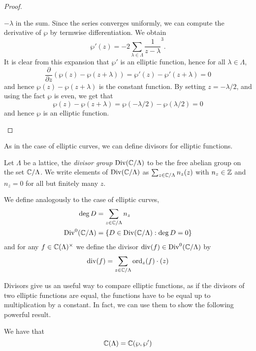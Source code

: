 \begin{proof}
\begin{enumerate}[label=(\alph*)]
		$-\lambda$ in the sum. Since the series converges uniformly,
		we can compute the derivative of $\wp$ by termwise differentiation.
		We obtain
		\begin{equation*}
			\wp'(z) = -2\sum_{\lambda \in \Lambda} \frac{1}{z - \lambda}^3.
		\end{equation*}
		It is clear from this expansion that $\wp'$ is an elliptic function,
		hence for all $\lambda \in \Lambda$,
		\begin{equation*}
			\frac{\partial}{\partial z}(\wp(z) - \wp(z + \lambda))
			= \wp'(z) - \wp'(z + \lambda) = 0
		\end{equation*}
		and hence $\wp(z) - \wp(z + \lambda)$ is the constant function.
		By setting $z = -\lambda/2$, and using the fact $\wp$ is even,
		we get that
		\begin{equation*}
			\wp(z) - \wp(z + \lambda) = \wp(-\lambda/2) - \wp(\lambda/2) = 0
		\end{equation*}
		and hence $\wp$ is an elliptic function.
	\end{enumerate}
\end{proof}

As in the case of elliptic curves, we can define divisors for elliptic
functions.
\begin{definition}
	Let $\Lambda$ be a lattice, the \emph{divisor group}
	$\operatorname{Div}(\mathbb{C}/\Lambda)$ to be the free abelian group on the set
	$\mathbb{C}/\Lambda$. We write elements of $\operatorname{Div}(\mathbb{C}/\Lambda)$ as
	$\sum_{z \in\mathbb{C}/\Lambda} n_z(z)$ with $n_z \in \mathbb{Z}$ and
	$n_z = 0$ for all but finitely many $z$.

	We define analogously to the case of elliptic curves,
	\begin{align*}
		\deg D &= \sum_{z \in \mathbb{C}/\Lambda} n_z\\
		\operatorname{Div}^0(\mathbb{C}/\Lambda) &= \{D \in \operatorname{Div}(\mathbb{C}/\Lambda): \deg D = 0\}
	\end{align*}
	and for any $f \in \mathbb{C}(\Lambda)^\times$ we define the divisor
	$\operatorname{div}(f) \in \operatorname{Div}^0(\mathbb{C}/\Lambda)$ by
	\begin{equation*}
		\operatorname{div}(f) = \sum_{z \in \mathbb{C}/\Lambda} \operatorname{ord}_z(f)\cdot(z)
	\end{equation*}
\end{definition}

Divisors give us an useful way to compare elliptic functions, as if
the divisors of two elliptic functions are equal, the functions have
to be equal up to multiplication by a constant.
In fact, we can use them to show the following powerful result.

\begin{theorem}
	\label{thm:wp-generates}
	We have that
	\begin{equation*}
		\mathbb{C}(\Lambda) = \mathbb{C}(\wp, \wp')
	\end{equation*}
\end{theorem}

